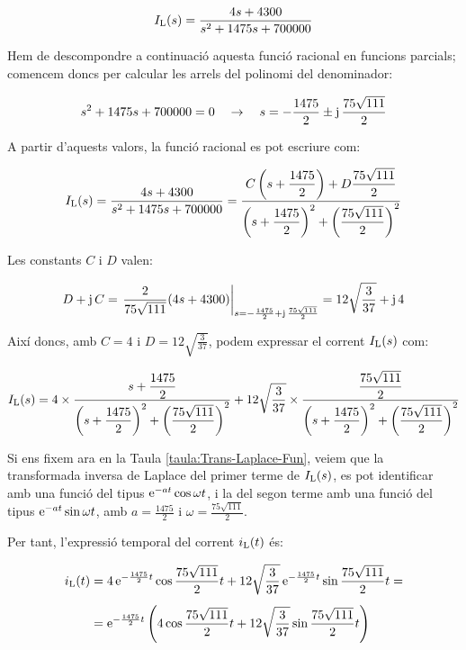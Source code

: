 \begin{exemple}
    \[
    I_\mathrm{L}(s) = \frac{4 s+ 4300}{s^2 +1475 s + 700000}
    \]

    Hem de descompondre a continuació aquesta funció racional en
    funcions parcials; comencem doncs per calcular les arrels del
    polinomi del denominador:

    \[
    s^2 +1475 s + 700000 = 0 \quad\rightarrow\quad s= -\frac{1475}{2}
    \pm \mathrm{j}\,\frac{75\sqrt{111}}{2}
    \]

    A partir d'aquests valors, la  funció racional es pot escriure com:

    \[
        I_\mathrm{L}(s) =
        \frac{4 s+ 4300}{s^2 +1475 s + 700000} =
        \frac{C\left(s+\dfrac{1475}{2}\right)+D\dfrac{75\sqrt{111}}{2}}
        {\left(s+\dfrac{1475}{2}\right)^2+\left(\dfrac{75\sqrt{111}}{2}\right)^2}
    \]

    Les constants $C$ i $D$ valen:

    \[
    D + \mathrm{j}\,C = \left.\frac{2}{75\sqrt{111}}(4 s
    +4300)\right|_{s=-\frac{1475}{2} + \mathrm{j}\,\frac{75\sqrt{111}}{2}}=
    12\sqrt{\frac{3}{37}} +\mathrm{j}\,4
    \]

    Així doncs, amb $C=4$ i $D=12\sqrt{\frac{3}{37}}$, podem expressar
    el corrent $I_\mathrm{L}(s)$ com:

    \[
        I_\mathrm{L}(s) = 4\times\frac{s+\dfrac{1475}{2}}
        {\left(s+\dfrac{1475}{2}\right)^2+\left(\dfrac{75\sqrt{111}}{2}\right)^2}
        + 12\sqrt{\frac{3}{37}}\times\frac{\dfrac{75\sqrt{111}}{2}}
        {\left(s+\dfrac{1475}{2}\right)^2+\left(\dfrac{75\sqrt{111}}{2}\right)^2}
    \]


     Si ens fixem ara en la Taula \vref{taula:Trans-Laplace-Fun},
    veiem que la transformada inversa de Laplace del primer terme de
    $I_\mathrm{L}(s)$, es pot identificar amb una funció del tipus
    $\mathrm{e}^{-at}\cos\omega t$, i la del segon terme amb una funció del tipus
    $\mathrm{e}^{-at}\sin\omega t$, amb $a=\frac{1475}{2}$ i
    $\omega=\frac{75\sqrt{111}}{2}$.

    Per tant, l'expressió temporal del corrent $i_\mathrm{L}(t)$ és:

    \[\begin{split}
        i_\mathrm{L}(t) &= 4\, \mathrm{e}^{-\frac{1475}{2}t} \cos \frac{75\sqrt{111}}{2} t +
        12\sqrt{\frac{3}{37}}\, \mathrm{e}^{-\frac{1475}{2}t} \sin
        \frac{75\sqrt{111}}{2}t = \\[1ex] &= \mathrm{e}^{-\frac{1475}{2}t} \left( 4
        \cos \frac{75\sqrt{111}}{2} t + 12\sqrt{\frac{3}{37}}\sin
        \frac{75\sqrt{111}}{2}t\right)
    \end{split}\]


\end{exemple}
